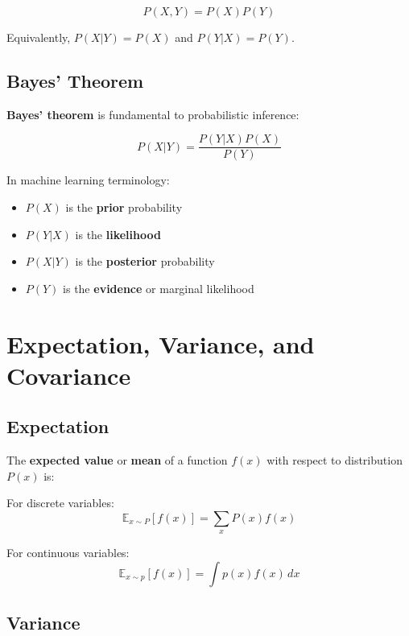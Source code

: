 \begin{equation}
P(X, Y) = P(X)P(Y)
\end{equation}

Equivalently, $P(X|Y) = P(X)$ and $P(Y|X) = P(Y)$.

\subsection{Bayes' Theorem}

\textbf{Bayes' theorem} is fundamental to probabilistic inference:

\begin{equation}
P(X|Y) = \frac{P(Y|X)P(X)}{P(Y)}
\end{equation}

In machine learning terminology:
\begin{itemize}
    \item $P(X)$ is the \textbf{prior} probability
    \item $P(Y|X)$ is the \textbf{likelihood}
    \item $P(X|Y)$ is the \textbf{posterior} probability
    \item $P(Y)$ is the \textbf{evidence} or marginal likelihood
\end{itemize}

\section{Expectation, Variance, and Covariance}
\label{sec:expectation-variance}

\subsection{Expectation}

The \textbf{expected value} or \textbf{mean} of a function $f(x)$ with respect to distribution $P(x)$ is:

For discrete variables:
\begin{equation}
\mathbb{E}_{x \sim P}[f(x)] = \sum_{x} P(x) f(x)
\end{equation}

For continuous variables:
\begin{equation}
\mathbb{E}_{x \sim p}[f(x)] = \int p(x) f(x) \, dx
\end{equation}

\subsection{Variance}

